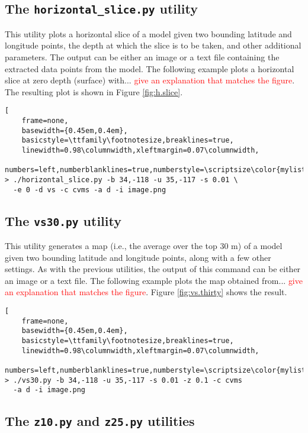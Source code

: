 

\subsection{The \textup{\texttt{horizontal\_slice.py}} utility}

This utility plots a horizontal slice of a model given two bounding latitude and longitude points, the depth at which the slice is to be taken, and other additional parameters. The output can be either an image or a text file containing the extracted data points from the model. The following example plots a horizontal slice at zero depth (surface) with... \textcolor{red}{give an explanation that matches the figure}. The resulting plot is shown in Figure \ref{fig:h.slice}.

\begin{lstlisting}[
	frame=none,
	basewidth={0.45em,0.4em},
	basicstyle=\ttfamily\footnotesize,breaklines=true,
	linewidth=0.98\columnwidth,xleftmargin=0.07\columnwidth,
	numbers=left,numberblanklines=true,numberstyle=\scriptsize\color{mylistingnclr}]
> ./horizontal_slice.py -b 34,-118 -u 35,-117 -s 0.01 \
  -e 0 -d vs -c cvms -a d -i image.png
\end{lstlisting}

\subsection{The \textup{\texttt{vs30.py}} utility}

This utility generates a \vsthirty{} map (i.e., the average \vs{} over the top 30 m) of a model given two bounding latitude and longitude points, along with a few other settings. As with the previous utilities, the output of this command can be either an image or a text file. The following example plots the \vsthirty map obtained from... \textcolor{red}{give an explanation that matches the figure}. Figure \ref{fig:vs.thirty} shows the result.

\begin{lstlisting}[
	frame=none,
	basewidth={0.45em,0.4em},
	basicstyle=\ttfamily\footnotesize,breaklines=true,
	linewidth=0.98\columnwidth,xleftmargin=0.07\columnwidth,
	numbers=left,numberblanklines=true,numberstyle=\scriptsize\color{mylistingnclr}]
> ./vs30.py -b 34,-118 -u 35,-117 -s 0.01 -z 0.1 -c cvms 
  -a d -i image.png
\end{lstlisting}

\subsection{The \textup{\texttt{z10.py}} and \textup{\texttt{z25.py}} utilities}

